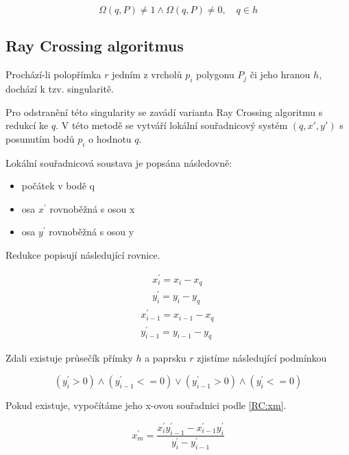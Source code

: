 \documentclass[11pt]{article}
\begin{document}
\begin{equation}
\Omega(q, P) \neq 1 \wedge \Omega(q, P) \neq 0, \quad q \in h
\end{equation}


\subsection{Ray Crossing algoritmus}
Prochází-li polopřímka $r$ jedním z vrcholů ${p_{i}}$ polygonu ${P_{j}}$ či jeho hranou $h$, dochází k tzv. singularitě.

Pro odstranění této singularity se zavádí varianta Ray Crossing algoritmu s redukcí ke $q$. V této metodě se vytváří lokální souřadnicový systém $(q,x',y')$ s posunutím bodů ${p_{i}}$ o hodnotu $q$. 

Lokální souřadnicová soustava je popsána následovně:
\begin{itemize}
\item počátek v bodě q
\item osa $x^{\prime}$ rovnoběžná s osou x
\item osa $y^{\prime}$ rovnoběžná s osou y
\end{itemize}

Redukce popisují následující rovnice.

\begin{eqnarray}
x_{i}^{\prime}=x_{i}-x_{q}\, \nonumber \\
y_{i}^{\prime}=y_{i}-y_{q} \
\end{eqnarray}
\begin{eqnarray}
x_{i-1}^{\prime}=x_{i-1}-x_{q}\, \nonumber \\
y_{i-1}^{\prime}=y_{i-1}-y_{q} \,
\end{eqnarray}

Zdali existuje průsečík přímky $h$ a paprsku $r$ zjistíme následující podmínkou

\begin{equation}
\left(y_{i}^{\prime}>0\right) \wedge\left(y_{i-1}^{\prime}<=0\right) \vee\left(y_{i-1}^{\prime}>0\right) \wedge\left(y_{i}^{\prime}<=0\right)
\end{equation}

Pokud existuje, vypočítáme jeho x-ovou souřadnici podle \ref{RC:xm}.

\begin{equation}
x_{m}^{\prime}=\frac{x_{i}^{\prime} y_{i-1}^{\prime}-x_{i-1}^{\prime} y_{i}^{\prime}}{y_{i}^{\prime}-y_{i-1}^{\prime}}
\label{RC:xm} 
\end{equation}
\end{document}
